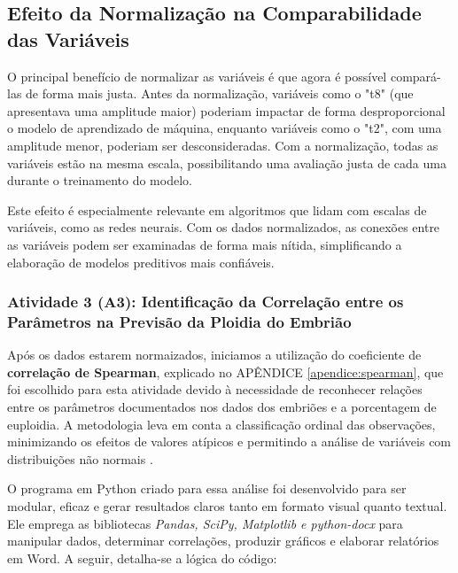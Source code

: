 \subsection*{Efeito da Normalização na Comparabilidade das Variáveis}
O principal benefício de normalizar as variáveis é que agora é possível compará-las de forma mais justa. Antes da normalização, variáveis como o "t8" (que apresentava uma amplitude maior) poderiam impactar de forma desproporcional o modelo de aprendizado de máquina, enquanto variáveis como o "t2", com uma amplitude menor, poderiam ser desconsideradas. Com a normalização, todas as variáveis estão na mesma escala, possibilitando uma avaliação justa de cada uma durante o treinamento do modelo.

Este efeito é especialmente relevante em algoritmos que lidam com escalas de variáveis, como as redes neurais. Com os dados normalizados, as conexões entre as variáveis podem ser examinadas de forma mais nítida, simplificando a elaboração de modelos preditivos mais confiáveis.

\subsubsection{Atividade 3 (A3): Identificação da Correlação entre os Parâmetros na Previsão da Ploidia do Embrião}

Após os dados estarem normaizados, iniciamos a utilização do coeficiente de \textbf{correlação de Spearman}, explicado no APÊNDICE \ref{apendice:spearman}, que foi escolhido para esta atividade devido à necessidade de reconhecer relações entre os parâmetros documentados nos dados dos embriões e a porcentagem de euploidia. A metodologia leva em conta a classificação ordinal das observações, minimizando os efeitos de valores atípicos e permitindo a análise de variáveis com distribuições não normais \cite{sousa2019}.

O programa em Python criado para essa análise foi desenvolvido para ser modular, eficaz e gerar resultados claros tanto em formato visual quanto textual. Ele emprega as bibliotecas \textit{Pandas, SciPy, Matplotlib e python-docx} para manipular dados, determinar correlações, produzir gráficos e elaborar relatórios em Word. A seguir, detalha-se a lógica do código:

